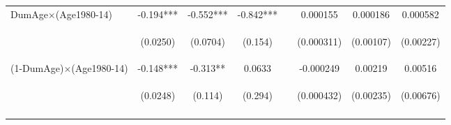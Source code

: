 \begin{subtables}
\begin{landscape}
\begin{table}[htpb!]
\begin{center}
\begin{tabular}{lcccp{0.3cm}ccc}
DumAge$\times$(Age1980-14)	&	-0.194***	&	-0.552***	&	-0.842***	&&	0.000155	&	0.000186	&	0.000582	 \\	
	& \begin{footnotesize}	(0.0250)	\end{footnotesize} & \begin{footnotesize}	(0.0704)	\end{footnotesize} & \begin{footnotesize}	(0.154)	\end{footnotesize} & \begin{footnotesize}\end{footnotesize} & \begin{footnotesize}	(0.000311)	\end{footnotesize} & \begin{footnotesize}	(0.00107)	\end{footnotesize} & \begin{footnotesize}	(0.00227)	\end{footnotesize} \\	
(1-DumAge)$\times$(Age1980-14)	&	-0.148***	&	-0.313**	&	0.0633	&&	-0.000249	&	0.00219	&	0.00516	 \\	
	& \begin{footnotesize}	(0.0248)	\end{footnotesize} & \begin{footnotesize}	(0.114)	\end{footnotesize} & \begin{footnotesize}	(0.294)	\end{footnotesize} & \begin{footnotesize}\end{footnotesize} & \begin{footnotesize}	(0.000432)	\end{footnotesize} & \begin{footnotesize}	(0.00235)	\end{footnotesize} & \begin{footnotesize}	(0.00676)	\end{footnotesize} \\	
\vspace{4pt}	&	\begin{footnotesize}\end{footnotesize}	&	\begin{footnotesize}\end{footnotesize}	&	\begin{footnotesize}\end{footnotesize}	& \begin{footnotesize}\end{footnotesize} &	\begin{footnotesize}\end{footnotesize}	&	\begin{footnotesize}\end{footnotesize}	&		\begin{footnotesize}\end{footnotesize}	 \\

\end{tabular}
\end{center}
\end{table}
\end{landscape}
\end{subtables}
